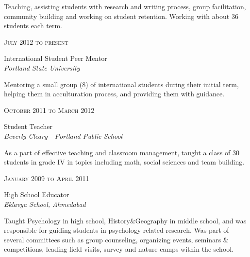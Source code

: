 \documentclass[10pt]{article} %
\begin{document}
{\begin{minipage}[t]{0.5\textwidth}
\normalsize{
Teaching, assisting students with research and writing process, group facilitation, community building and working on student retention. Working with about 36 students each term.
}\\

{\raggedleft\textsc{July 2012 to present}\par}
{\raggedright\large International Student Peer Mentor\\
\textit{Portland State University}\\[5pt]}

\normalsize{
Mentoring a small group (8) of international students during their initial term, helping them in acculturation process, and providing them with guidance.
}\\




{\raggedleft\textsc{October 2011 to March 2012}\par}

{\raggedright\large Student Teacher\\
\textit{Beverly Cleary - Portland Public School}\\[5pt]}

\normalsize{
As a part of effective teaching and classroom management, taught a class of 30 students in grade IV in topics including math, social sciences and team building.
}\\

{\raggedleft\textsc{January 2009 to April 2011}\par}

{\raggedright\large High School Educator\\
\textit{Eklavya School, Ahmedabad}\\[5pt]}

\normalsize{
Taught Psychology in high school, History\&Geography in middle school, and was responsible for guiding students in psychology related research. Was part of several committees such
as group counseling, organizing events, seminars \& competitions, leading field visits, survey and nature camps within the school.
}\\


\end{minipage}}
\end{document}

